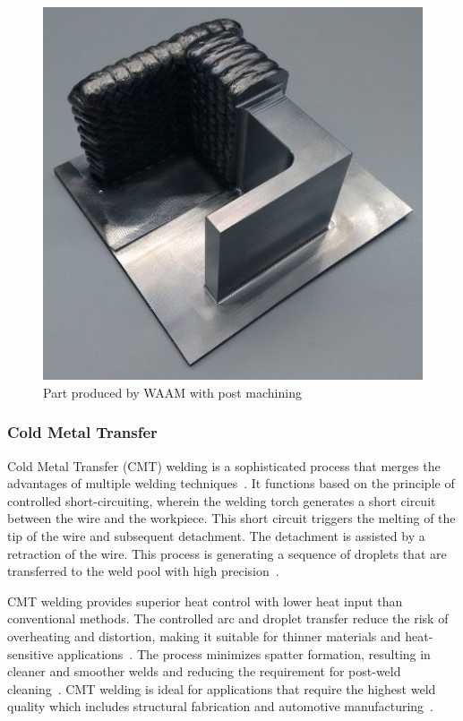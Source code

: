 \begin{figure}[H]
	\centerline{\includegraphics[scale=.6]{figures/WAAMba.jpg}}
	\caption{Part produced by WAAM with post machining~\cite{WAAMba}}
	\label{WAAMba}
\end{figure}

\subsubsection{Cold Metal Transfer}\label{CMT}


Cold Metal Transfer (CMT) welding is a sophisticated process that merges the advantages of multiple welding techniques~\cite{Dutra.2015}. It functions based on the principle of controlled short-circuiting, wherein the welding torch generates a short circuit between the wire and the workpiece. This short circuit triggers the melting of the tip of the wire and subsequent detachment. The detachment is assisted by a retraction of the wire. This process is generating a sequence of droplets that are transferred to the weld pool with high precision~\cite{Selvi.2018, Srinivasan.2022}.

CMT welding provides superior heat control with lower heat input than conventional methods. The controlled arc and droplet transfer reduce the risk of overheating and distortion, making it suitable for thinner materials and heat-sensitive applications~\cite{Scotti.2020}. The process minimizes spatter formation, resulting in cleaner and smoother welds and reducing the requirement for post-weld cleaning~\cite{Srinivasan.2022}. %
CMT welding is ideal for applications that require the highest weld quality which includes structural fabrication and automotive manufacturing~\cite{Cong.2016}.

